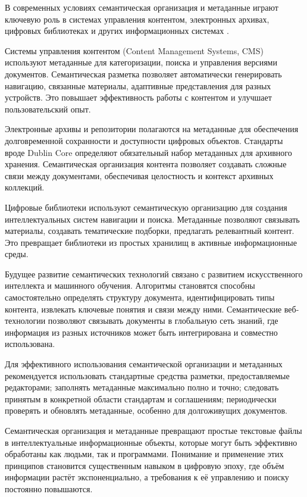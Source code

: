 \documentclass{SibFU-docs}
\begin{document}
В современных условиях семантическая организация и метаданные играют ключевую роль в системах управления контентом, электронных архивах, цифровых библиотеках и других информационных системах \cite{bernerslee2001semanticweb, gilliland2016metadata}.

Системы управления контентом (Content Management Systems, CMS) используют метаданные для категоризации, поиска и управления версиями документов. Семантическая разметка позволяет автоматически генерировать навигацию, связанные материалы, адаптивные представления для разных устройств. Это повышает эффективность работы с контентом и улучшает пользовательский опыт.

Электронные архивы и репозитории полагаются на метаданные для обеспечения долговременной сохранности и доступности цифровых объектов. Стандарты вроде Dublin Core определяют обязательный набор метаданных для архивного хранения. Семантическая организация контента позволяет создавать сложные связи между документами, обеспечивая целостность и контекст архивных коллекций.

Цифровые библиотеки используют семантическую организацию для создания интеллектуальных систем навигации и поиска. Метаданные позволяют связывать материалы, создавать тематические подборки, предлагать релевантный контент. Это превращает библиотеки из простых хранилищ в активные информационные среды.

Будущее развитие семантических технологий связано с развитием искусственного интеллекта и машинного обучения. Алгоритмы становятся способны самостоятельно определять структуру документа, идентифицировать типы контента, извлекать ключевые понятия и связи между ними. Семантические веб-технологии позволяют связывать документы в глобальную сеть знаний, где информация из разных источников может быть интегрирована и совместно использована.

Для эффективного использования семантической организации и метаданных рекомендуется использовать стандартные средства разметки, предоставляемые редакторами; заполнять метаданные максимально полно и точно; следовать принятым в конкретной области стандартам и соглашениям; периодически проверять и обновлять метаданные, особенно для долгоживущих документов.

Семантическая организация и метаданные превращают простые текстовые файлы в интеллектуальные информационные объекты, которые могут быть эффективно обработаны как людьми, так и программами. Понимание и применение этих принципов становится существенным навыком в цифровую эпоху, где объём информации растёт экспоненциально, а требования к её управлению и поиску постоянно повышаются.
\end{document}
